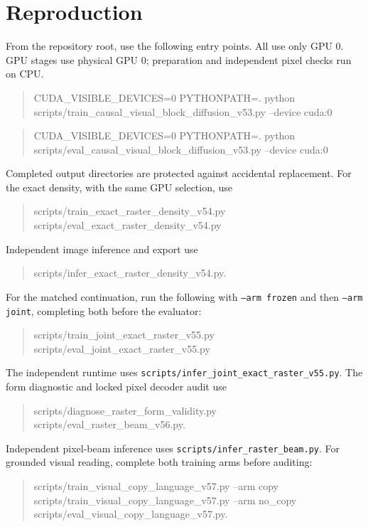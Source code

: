 \documentclass[10pt,a4paper]{article}
\providecommand{\DIFadd}[1]{{\protect\color{blue} \sf #1}} %
\providecommand{\DIFdel}[1]{{\protect\color{red} \scriptsize #1}} %
\providecommand{\DIFaddbegin}{} %
\providecommand{\DIFaddend}{} %
\providecommand{\DIFdelbegin}{} %
\providecommand{\DIFdelend}{} %
\begin{document}
\DIFaddend \section*{Reproduction}
From the repository root, use the following entry points. \DIFdelbegin \DIFdel{All use
only GPU 0.
}\DIFdelend \DIFaddbegin \DIFadd{GPU stages use
physical GPU 0; preparation and independent pixel checks run on CPU.
}\DIFaddend \begin{quote}\small\ttfamily
CUDA\_VISIBLE\_DEVICES=0 PYTHONPATH=. python\\
scripts/train\_causal\_visual\_block\_diffusion\_v53.py --device cuda:0
\end{quote}
\begin{quote}\small\ttfamily
CUDA\_VISIBLE\_DEVICES=0 PYTHONPATH=. python\\
scripts/eval\_causal\_visual\_block\_diffusion\_v53.py --device cuda:0
\end{quote}
Completed output directories are protected against accidental replacement.
For the exact density, with the same GPU selection, use
\begin{quote}\small\ttfamily
scripts/train\_exact\_raster\_density\_v54.py\\
scripts/eval\_exact\_raster\_density\_v54.py
\end{quote}
Independent image inference and export use
\begin{quote}\small\ttfamily
scripts/infer\_exact\_raster\_density\_v54.py.
\end{quote}
For the matched continuation, run the following with \texttt{--arm frozen}
and then \texttt{--arm joint}, completing both before the evaluator:
\begin{quote}\small\ttfamily
scripts/train\_joint\_exact\_raster\_v55.py\\
scripts/eval\_joint\_exact\_raster\_v55.py
\end{quote}
The independent runtime uses
\texttt{scripts/infer\_joint\_exact\_raster\_v55.py}.
The form diagnostic and locked pixel decoder audit use
\begin{quote}\small\ttfamily
scripts/diagnose\_raster\_form\_validity.py\\
scripts/eval\_raster\_beam\_v56.py.
\end{quote}
Independent pixel-beam inference uses
\texttt{scripts/infer\_raster\_beam.py}.
For grounded visual reading, complete both training arms before auditing:
\begin{quote}\small\ttfamily
scripts/train\_visual\_copy\_language\_v57.py --arm copy\\
scripts/train\_visual\_copy\_language\_v57.py --arm no\_copy\\
scripts/eval\_visual\_copy\_language\_v57.py.
\end{quote}
\end{document}
